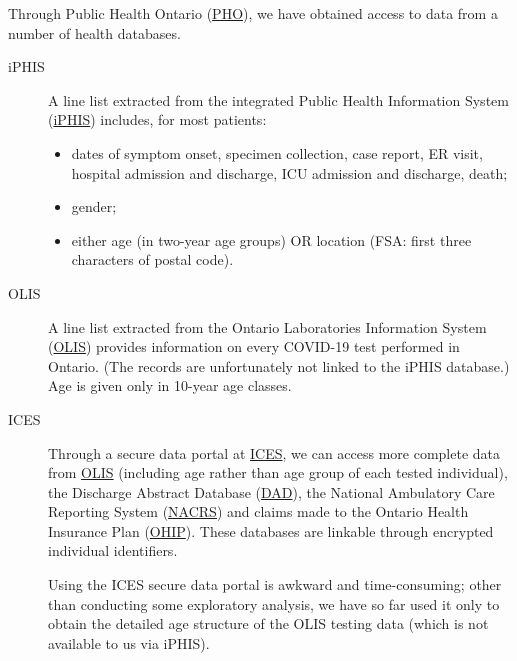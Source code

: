 \documentclass[12pt]{article}\usepackage[]{graphicx}\usepackage[]{color}
\begin{document}
Through Public Health Ontario
(\href{https://www.publichealthontario.ca/}{PHO}), we have obtained access to
data from a number of health databases.
\begin{description}
\item[iPHIS]A line list extracted from the integrated Public Health
  Information System
  (\href{https://www.publichealthontario.ca/en/diseases-and-conditions/infectious-diseases/ccm/iphis}{iPHIS})
  includes, for most patients:
  \begin{itemize}
  \item dates of symptom onset, specimen collection, case report, ER
    visit, hospital admission and discharge, ICU admission and
    discharge, death;
  \item gender;
  \item either age (in two-year age groups) OR location (FSA: first
    three characters of postal code).

  \end{itemize}
\item[OLIS]A line list extracted from the Ontario Laboratories
  Information System
  (\href{https://www.ehealthontario.on.ca/en/for-healthcare-professionals/ontario-laboratories-information-system-olis}{OLIS})
  provides information on every COVID-19 test performed in Ontario.
  (The records are unfortunately not linked to the iPHIS database.)
  Age is given only in 10-year age classes.
\item[ICES]Through a secure data portal at
  \href{https://www.ices.on.ca/}{ICES}, we can access more complete
  data from
  \href{https://www.ehealthontario.on.ca/en/for-healthcare-professionals/ontario-laboratories-information-system-olis}{OLIS}
  (including age rather than age group of each tested individual), the
  Discharge Abstract Database
  (\href{https://www.cihi.ca/en/discharge-abstract-database-metadata}{DAD}),
  the National Ambulatory Care Reporting System
  (\href{https://www.cihi.ca/en/national-ambulatory-care-reporting-system-metadata}{NACRS})
  and claims made to the Ontario Health Insurance Plan
  (\href{https://www.ontario.ca/page/what-ohip-covers}{OHIP}).  These
  databases are linkable through encrypted individual identifiers.

  Using the ICES secure data portal is awkward and time-consuming;
  other than conducting some exploratory analysis, we have so far used
  it only to obtain the detailed age structure of the OLIS testing
  data (which is not available to us via iPHIS).
\end{description}
\end{document}
